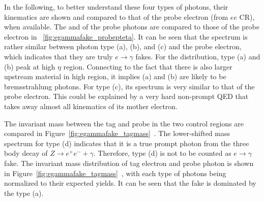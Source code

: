 In the following, to better understand these four types of photons, their kinematics are shown and compared to that of the probe electron (from $ee$ CR), when available. The \pt and \abseta of the probe photons are compared to those of the probe electron in ~\cref{fig:egammafake_probepteta}. It can be seen that the \pt spectrum is rather similar between photon type (a), (b), and (c) and the probe electron, which indicates that they are truly $e\to\gamma$ fakes. For the \abseta distribution, type (a) and (b) peak at high $\eta$ region. Connecting to the fact that there is also larger upstream material in high \abseta region, it implies (a) and (b) are likely to be bremsstrahlung photons. For type (c), its \abseta spectrum is very similar to that of the probe electron. This could be explained by a very hard non-prompt QED that takes away almost all kinematics of its mother electron.

The invariant mass between the tag and probe in the two control regions are compared in Figure~\ref{fig:egammafake_tagmass}~. The lower-shifted mass spectrum for type (d) indicates that it is a true prompt photon from the three body decay of $Z\to e^+e^- +\gamma$. Therefore, type (d) is not to be counted as $e\rightarrow \gamma$ fake. The invariant mass distribution of tag electron and probe photon is shown in Figure~\ref{fig:egammafake_tagmass}~, with each type of photons being normalized to their expected yields. It can be seen that the fake is dominated by the type (a).


